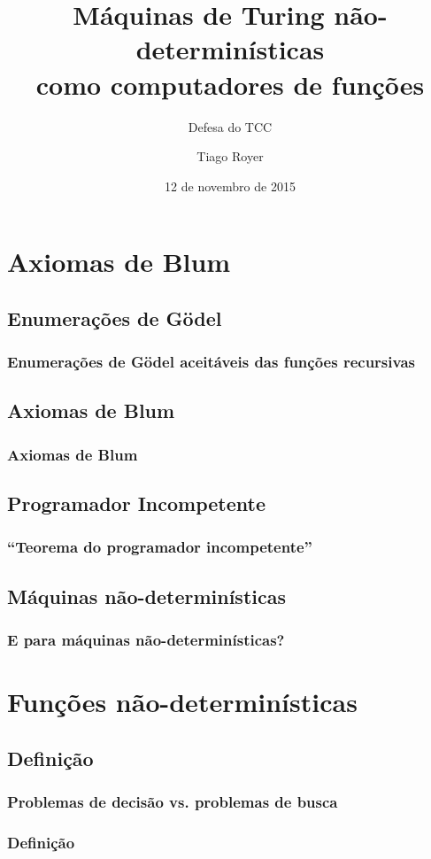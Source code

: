 \documentclass[utf8,notheorems]{beamer}
\theoremstyle{definition}
\begin{document}
\author{Tiago Royer}
\title{
    Máquinas de Turing não-determinísticas \\
    como computadores de funções
}
\subtitle{Defesa do TCC}
\date{12 de novembro de 2015}
\begin{frame}
    \titlepage
\end{frame}

\section{Axiomas de Blum}

\subsection{Enumerações de Gödel}
\begin{frame}
    \frametitle{Enumerações de Gödel aceitáveis das funções recursivas}
\end{frame}

\subsection{Axiomas de Blum}
\begin{frame}
    \frametitle{Axiomas de Blum}
\end{frame}

\subsection{Programador Incompetente}
\begin{frame}
    \frametitle{``Teorema do programador incompetente''}
\end{frame}

\subsection{Máquinas não-determinísticas}
\begin{frame}
    \frametitle{E para máquinas não-determinísticas?}
\end{frame}

\section{Funções não-determinísticas}

\subsection{Definição}
\begin{frame}
    \frametitle{Problemas de decisão vs. problemas de busca}
\end{frame}
\begin{frame}
    \frametitle{Definição}
\end{frame}
\end{document}
